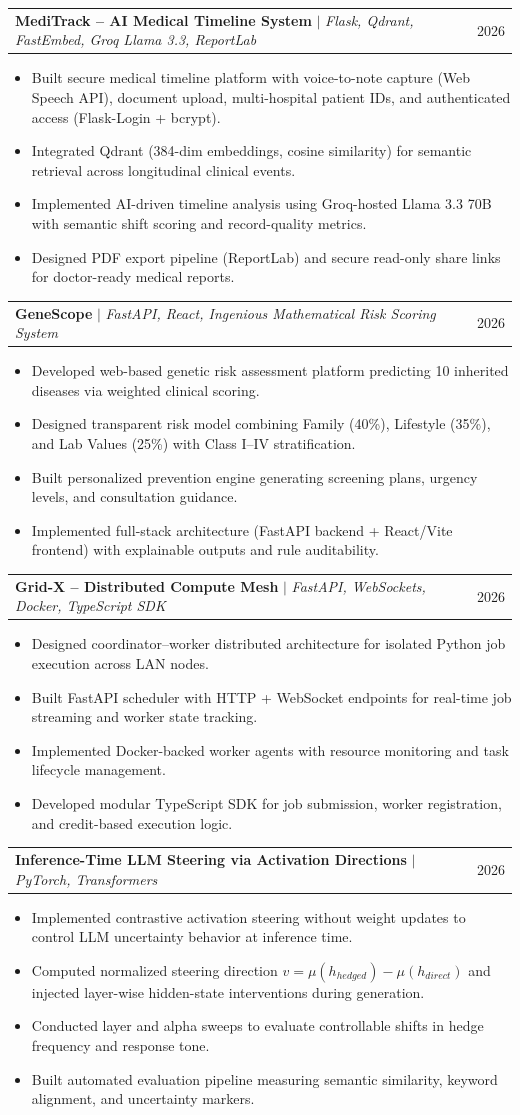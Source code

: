 \documentclass[letterpaper,11pt]{article}
\makeatletter
\newcommand{\resumeItem}[1]{
  \item\small{
    {#1 \vspace{-2pt}}
  }
}
\newcommand{\resumeProjectHeading}[2]{
    \item
    \begin{tabular*}{0.97\textwidth}{l@{\extracolsep{\fill}}r}
      \small#1 & #2 \\
    \end{tabular*}\vspace{-7pt}
}
\newcommand{\resumeItemListStart}{\begin{itemize}}
\newcommand{\resumeItemListEnd}{\end{itemize}\vspace{-5pt}}
\makeatother
\begin{document}
\resumeProjectHeading
{\textbf{MediTrack – AI Medical Timeline System} $|$ \emph{Flask, Qdrant, FastEmbed, Groq Llama 3.3, ReportLab}}{2026}
\resumeItemListStart
\resumeItem{Built secure medical timeline platform with voice-to-note capture (Web Speech API), document upload, multi-hospital patient IDs, and authenticated access (Flask-Login + bcrypt).}
\resumeItem{Integrated Qdrant (384-dim embeddings, cosine similarity) for semantic retrieval across longitudinal clinical events.}
\vspace{-12pt}
\resumeItem{Implemented AI-driven timeline analysis using Groq-hosted Llama 3.3 70B with semantic shift scoring and record-quality metrics.}
\resumeItem{Designed PDF export pipeline (ReportLab) and secure read-only share links for doctor-ready medical reports.}
\resumeItemListEnd

\resumeProjectHeading
{\textbf{GeneScope} $|$ \emph{FastAPI, React, Ingenious Mathematical Risk Scoring System}}{2026}
\resumeItemListStart
\resumeItem{Developed web-based genetic risk assessment platform predicting 10 inherited diseases via weighted clinical scoring.}
\vspace{-12pt}
\resumeItem{Designed transparent risk model combining Family (40\%), Lifestyle (35\%), and Lab Values (25\%) with Class I--IV stratification.}
\resumeItem{Built personalized prevention engine generating screening plans, urgency levels, and consultation guidance.}
\resumeItem{Implemented full-stack architecture (FastAPI backend + React/Vite frontend) with explainable outputs and rule auditability.}
\resumeItemListEnd


\resumeProjectHeading
{\textbf{Grid-X – Distributed Compute Mesh} $|$ \emph{FastAPI, WebSockets, Docker, TypeScript SDK}}{2026}
\resumeItemListStart
\resumeItem{Designed coordinator–worker distributed architecture for isolated Python job execution across LAN nodes.}
\resumeItem{Built FastAPI scheduler with HTTP + WebSocket endpoints for real-time job streaming and worker state tracking.}
\vspace{-12pt}
\resumeItem{Implemented Docker-backed worker agents with resource monitoring and task lifecycle management.}
\resumeItem{Developed modular TypeScript SDK for job submission, worker registration, and credit-based execution logic.}
\resumeItemListEnd


\resumeProjectHeading
{\textbf{Inference-Time LLM Steering via Activation Directions} $|$ \emph{PyTorch, Transformers}}{2026}
\resumeItemListStart
\resumeItem{Implemented contrastive activation steering without weight updates to control LLM uncertainty behavior at inference time.}
\resumeItem{Computed normalized steering direction $v = \mu(h_{hedged}) - \mu(h_{direct})$ and injected layer-wise hidden-state interventions during generation.}
\resumeItem{Conducted layer and alpha sweeps to evaluate controllable shifts in hedge frequency and response tone.}
\resumeItem{Built automated evaluation pipeline measuring semantic similarity, keyword alignment, and uncertainty markers.}
\resumeItemListEnd
\end{document}
